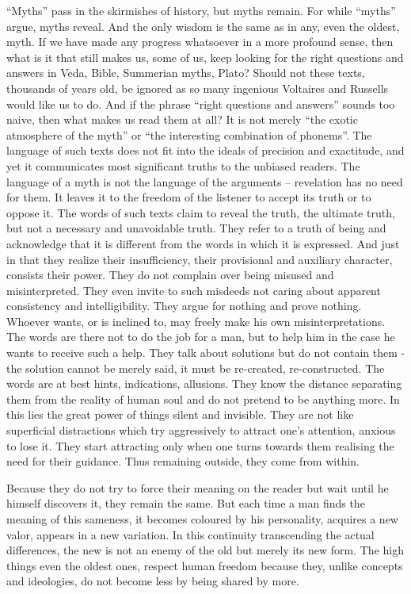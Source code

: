 ``Myths'' pass in the skirmishes of history, but myths remain. For while ``myths''
argue, myths reveal.
And the only wisdom  is the same as in any, even the oldest, myth.
If we have made any progress whatsoever in 
a more profound sense, then what is it that still makes us, some of us, keep
looking for the right questions and answers in Veda, Bible, Summerian myths,
Plato? Should not these texts, thousands of years old, be ignored as so many
ingenious Voltaires and Russells would like us to do. And if the phrase
``right questions and answers'' sounds too naive, then what makes us read them
at all? It is not merely ``the exotic atmosphere of the myth'' or ``the 
interesting combination of phonems''. 
The language of such texts does not fit into the ideals of precision and 
exactitude, and yet it communicates most significant truths to the unbiased
readers. The language of a myth is not the language of the arguments --
revelation has no need for them.
It leaves it
to the freedom of the listener to accept its truth or to oppose it. The words
of such texts claim
to reveal the truth, the ultimate truth, but not a necessary and unavoidable
truth. They refer to a truth of being and acknowledge that it is different from
the words in which it is expressed. And just in that they realize their
insufficiency, their provisional and auxiliary character, consists their power.
They do not complain over being misused and misinterpreted. They even invite to
such misdeeds not caring about apparent consistency and intelligibility. They
argue for nothing and prove nothing. Whoever wants, or is inclined to, may
freely make his own misinterpretations. The words are there not to do the job
for a man, but to help him in the case he wants to receive such a help. They
talk about solutions but do not contain them - the solution cannot be merely 
said, it must  be re-created, re-constructed. The words are at best hints, 
indications, allusions. They know the distance separating them from the reality
of human soul and do not pretend to be anything more. In this lies the great
power of things silent and invisible. They are not like superficial
distractions which try aggressively to attract one's attention, anxious to
lose it. They start attracting only when one  turns towards them 
realising the need for their guidance. Thus remaining outside, they come from
within.

Because they do not try to force their meaning on the reader but wait until he
himself discovers it, they remain the same. But each time a man finds
the meaning of this sameness, it becomes coloured by his personality, acquires
a new valor, appears in a new variation. In this continuity transcending the
actual differences, the new is not an enemy of the old but merely its new form.
The high things even the oldest ones, respect human freedom
because they, unlike concepts and ideologies, do not become less by being 
shared by more. 

